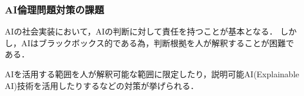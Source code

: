 \subsubsection{AI倫理問題対策の課題}

AIの社会実装において，AIの判断に対して責任を持つことが基本となる．
しかし，AIはブラックボックス的である為，判断根拠を人が解釈することが困難である．

AIを活用する範囲を人が解釈可能な範囲に限定したり，説明可能AI(Explainable AI)技術を活用したりするなどの対策が挙げられる．

